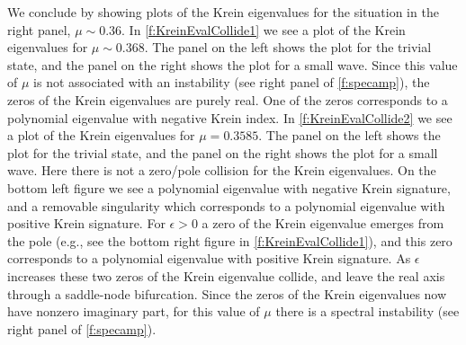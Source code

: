 \documentclass[review,onefignum,onetabnum]{siamart171218}
\begin{document}
We conclude by showing plots of the Krein eigenvalues for the situation in the right panel, $\mu\sim0.36$. In \cref{f:KreinEvalCollide1} we see
a plot of the Krein eigenvalues for $\mu\sim0.368$. The panel on the left
shows the plot for the trivial state, and the panel on the right shows the
plot for a small wave. Since this value of $\mu$ is not associated with an
instability (see right panel of \cref{f:specamp}), the zeros of the Krein
eigenvalues are purely real. One of the zeros corresponds to a polynomial eigenvalue with negative Krein index. In
\cref{f:KreinEvalCollide2} we see a plot of the Krein eigenvalues for
$\mu=0.3585$. The panel on the left shows the plot for the trivial state, and
the panel on the right shows the plot for a small wave. Here there is not a
zero/pole collision for the Krein eigenvalues. On the bottom left figure we see a polynomial eigenvalue with negative Krein signature, and a removable singularity which corresponds to a polynomial eigenvalue with positive Krein signature. For $\epsilon>0$ a zero of the Krein eigenvalue emerges from the pole (e.g., see the bottom right figure in \cref{f:KreinEvalCollide1}), and this zero corresponds to a polynomial eigenvalue with positive Krein signature. As $\epsilon$ increases these two zeros of the Krein eigenvalue collide, and leave the real axis through a saddle-node bifurcation. Since the
zeros of the Krein eigenvalues now have nonzero imaginary part, for this value of $\mu$ there is a spectral instability (see right panel of \cref{f:specamp}).

\end{document}
